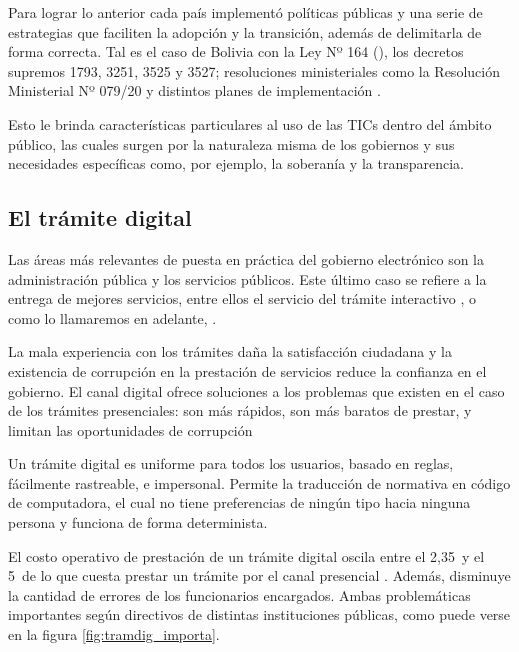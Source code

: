 Para lograr lo anterior cada país implementó políticas públicas y una serie de estrategias que faciliten la adopción y la transición, además de delimitarla de forma correcta.
Tal es el caso de Bolivia con la Ley Nº 164 (\cite{Ley164Ley2011}), 
los decretos supremos 1793, 3251, 3525 y 3527; resoluciones ministeriales como la Resolución Ministerial Nº 079/20 y distintos planes de implementación \cite{DecretoSupremo17932013}\cite{DecretoSupremoNo2017}\cite{DECRETOSUPREMO35252018}\cite{DecretoSupremoNo2018}\cite{ResolucionMinisterialNo2020}\cite{PLANIMPLEMENTACIONSOFTWARE}.

Esto le brinda características particulares al uso de las TICs dentro del ámbito público, 
las cuales surgen por la naturaleza misma de los gobiernos y sus necesidades específicas como, por ejemplo, la soberanía y la transparencia.

\subsection{El trámite digital}

Las áreas más relevantes de puesta en práctica del gobierno electrónico son la administración pública y los servicios públicos. 
Este último caso se refiere a la entrega de mejores servicios, entre ellos el servicio del trámite interactivo \cite{naserGobiernoElectronicoGestion2011}, o como lo llamaremos en adelante, .

La mala experiencia con los trámites daña la satisfacción ciudadana y la existencia de corrupción en la prestación de servicios reduce la confianza en el gobierno\cite[71]{rosethFinTramiteEterno2018}.
El canal digital ofrece soluciones a los problemas que existen en el caso de los trámites presenciales: son más rápidos, son más baratos de prestar, y limitan las oportunidades de corrupción \cite[99]{rosethFinTramiteEterno2018}

Un trámite digital es uniforme para todos los usuarios, basado en reglas, fácilmente rastreable, e impersonal\cite[105]{rosethFinTramiteEterno2018}. 
Permite la traducción de normativa en código de computadora, el cual no tiene preferencias de ningún tipo hacia ninguna persona y funciona de forma determinista.

El costo operativo de prestación de un trámite digital oscila entre el 2,35\percentsign~y el 5\percentsign~de lo que cuesta prestar un trámite por el canal presencial \cite[11]{parejaGestionIdentidadSu}. Además, disminuye la cantidad de errores de los funcionarios encargados. Ambas problemáticas importantes según directivos de distintas instituciones públicas, como puede verse en la figura \ref{fig:tramdig_importa}.


